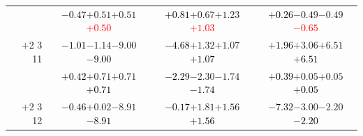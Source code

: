 \documentclass[compress]{beamer}
\begin{document}
\begin{frame}
\begin{tabular}{r | c | c | c}
          & \textcolor{black}{$-0.47$}\hspace{0.1 cm}$+0.51$\hspace{0.1 cm}$+0.51$\hspace{0.1 cm}\textcolor{red}{$+0.50$} & \textcolor{black}{$+0.81$}\hspace{0.1 cm}$+0.67$\hspace{0.1 cm}$+1.23$\hspace{0.1 cm}\textcolor{red}{$+1.03$} & \textcolor{black}{$+0.26$}\hspace{0.1 cm}$-0.49$\hspace{0.1 cm}$-0.49$\hspace{0.1 cm}\textcolor{red}{$-0.65$} \\
$+$2 3 11 & \textcolor{black}{$-1.01$}\hspace{0.1 cm}$-1.14$\hspace{0.1 cm}$-9.00$\hspace{0.1 cm}\textcolor{black}{$-9.00$} & \textcolor{black}{$-4.68$}\hspace{0.1 cm}$+1.32$\hspace{0.1 cm}$+1.07$\hspace{0.1 cm}\textcolor{black}{$+1.07$} & \textcolor{black}{$+1.96$}\hspace{0.1 cm}$+3.06$\hspace{0.1 cm}$+6.51$\hspace{0.1 cm}\textcolor{black}{$+6.51$} \\
          & \textcolor{black}{$+0.42$}\hspace{0.1 cm}$+0.71$\hspace{0.1 cm}$+0.71$\hspace{0.1 cm}\textcolor{black}{$+0.71$} & \textcolor{black}{$-2.29$}\hspace{0.1 cm}$-2.30$\hspace{0.1 cm}$-1.74$\hspace{0.1 cm}\textcolor{black}{$-1.74$} & \textcolor{black}{$+0.39$}\hspace{0.1 cm}$+0.05$\hspace{0.1 cm}$+0.05$\hspace{0.1 cm}\textcolor{black}{$+0.05$} \\
$+$2 3 12 & \textcolor{black}{$-0.46$}\hspace{0.1 cm}$+0.02$\hspace{0.1 cm}$-8.91$\hspace{0.1 cm}\textcolor{black}{$-8.91$} & \textcolor{black}{$-0.17$}\hspace{0.1 cm}$+1.81$\hspace{0.1 cm}$+1.56$\hspace{0.1 cm}\textcolor{black}{$+1.56$} & \textcolor{black}{$-7.32$}\hspace{0.1 cm}$-3.00$\hspace{0.1 cm}$-2.20$\hspace{0.1 cm}\textcolor{black}{$-2.20$} \\

\end{tabular}
\end{frame}
\end{document}
